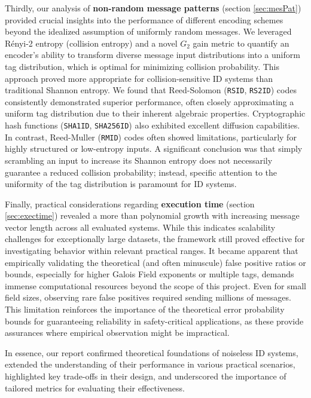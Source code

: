\documentclass[english,BCOR=4mm,cdfont=false]{tudscrreprt} %
\begin{document}
Thirdly, our analysis of \textbf{non-random message patterns} (section \ref{sec:mesPat}) provided crucial insights into the performance of different encoding schemes beyond the idealized assumption of uniformly random messages. We leveraged Rényi-2 entropy (collision entropy) and a novel $G_2$ gain metric to quantify an encoder's ability to transform diverse message input distributions into a uniform tag distribution, which is optimal for minimizing collision probability. This approach proved more appropriate for collision-sensitive ID systems than traditional Shannon entropy. We found that Reed-Solomon (\texttt{RSID}, \texttt{RS2ID}) codes consistently demonstrated superior performance, often closely approximating a uniform tag distribution due to their inherent algebraic properties. Cryptographic hash functions (\texttt{SHA1ID}, \texttt{SHA256ID}) also exhibited excellent diffusion capabilities. In contrast, Reed-Muller (\texttt{RMID}) codes often showed limitations, particularly for highly structured or low-entropy inputs. A significant conclusion was that simply scrambling an input to increase its Shannon entropy does not necessarily guarantee a reduced collision probability; instead, specific attention to the uniformity of the tag distribution is paramount for ID systems.

Finally, practical considerations regarding \textbf{execution time} (section \ref{sec:exectime}) revealed a more than polynomial growth with increasing message vector length across all evaluated systems. While this indicates scalability challenges for exceptionally large datasets, the framework still proved effective for investigating behavior within relevant practical ranges. It became apparent that empirically validating the theoretical (and often minuscule) false positive ratios or bounds, especially for higher Galois Field exponents or multiple tags, demands immense computational resources beyond the scope of this project. Even for small field sizes, observing rare false positives required sending millions of messages. This limitation reinforces the importance of the theoretical error probability bounds for guaranteeing reliability in safety-critical applications, as these provide assurances where empirical observation might be impractical.

In essence, our report confirmed theoretical foundations of noiseless ID systems, extended the understanding of their performance in various practical scenarios, highlighted key trade-offs in their design, and underscored the importance of tailored metrics for evaluating their effectiveness.
\end{document}
